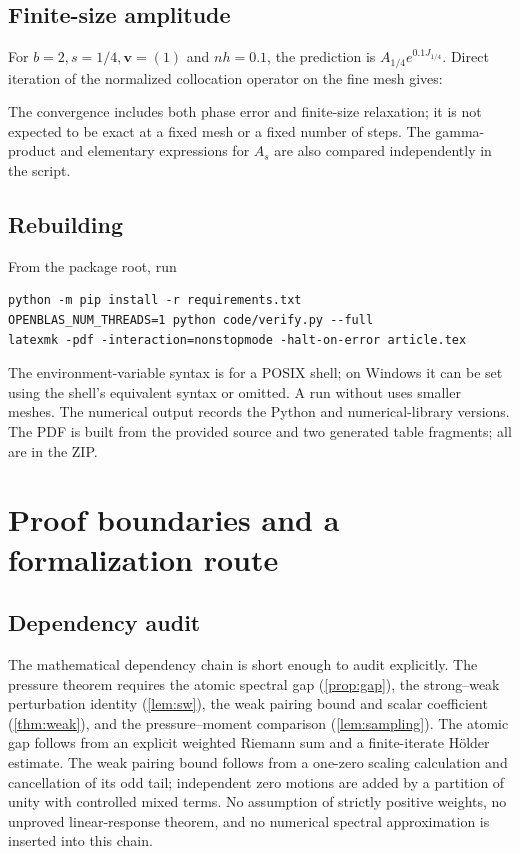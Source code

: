 \documentclass[11pt,a4paper]{article}
\numberwithin{equation}{section}
\theoremstyle{definition}
\theoremstyle{remark}
\newcommand{\vel}{\boldsymbol v}
\newcommand{\code}[1]{\texttt{\detokenize{#1}}}
\begin{document}
\subsection{Finite-size amplitude}
For $b=2,s=1/4,\vel=(1)$ and $nh=0.1$, the prediction is
$A_{1/4}e^{0.1J_{1/4}}$. Direct iteration of the normalized collocation
operator on the fine mesh gives:
\begin{center}\small

\end{center}
The convergence includes both phase error and finite-size relaxation;
it is not expected to be exact at a fixed mesh or a fixed number of
steps. The gamma-product and elementary expressions for $A_s$ are also
compared independently in the script.

\subsection{Rebuilding}
From the package root, run
\begin{verbatim}
python -m pip install -r requirements.txt
OPENBLAS_NUM_THREADS=1 python code/verify.py --full
latexmk -pdf -interaction=nonstopmode -halt-on-error article.tex
\end{verbatim}
The environment-variable syntax is for a POSIX shell; on Windows it can
be set using the shell's equivalent syntax or omitted. A run without
\code{--full} uses smaller meshes. The numerical output records the
Python and numerical-library versions. The PDF is built from the
provided source and two generated table fragments; all are in the ZIP.

\section{Proof boundaries and a formalization route}
\label{sec:audit}

\subsection{Dependency audit}
The mathematical dependency chain is short enough to audit explicitly.
The pressure theorem requires the atomic spectral gap
(\cref{prop:gap}), the strong--weak perturbation identity
(\cref{lem:sw}), the weak pairing bound and scalar coefficient
(\cref{thm:weak}), and the pressure--moment comparison
(\cref{lem:sampling}). The atomic gap follows from an explicit weighted
Riemann sum and a finite-iterate H\"older estimate. The weak pairing
bound follows from a one-zero scaling calculation and cancellation of
its odd tail; independent zero motions are added by a partition of
unity with controlled mixed terms. No assumption of strictly positive
weights, no unproved linear-response theorem, and no
numerical spectral approximation is inserted into this chain.
\end{document}
